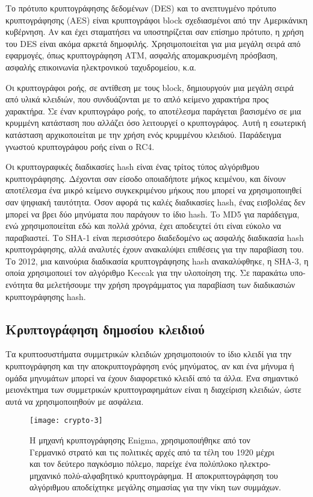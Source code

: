 Το πρότυπο κρυπτογράφησης δεδομένων (DES) και το ανεπτυγμένο πρότυπο κρυπτογράφησης (AES) είναι κρυπτογράφοι block σχεδιασμένοι από την Αμερικάνικη κυβέρνηση. Αν και έχει σταματήσει να υποστηρίζεται σαν επίσημο πρότυπο, η χρήση του DES είναι ακόμα αρκετά δημοφιλής. Χρησιμοποιείται για μια μεγάλη σειρά από εφαρμογές, όπως κρυπτογράφηση ATM, ασφαλής απομακρυσμένη πρόσβαση, ασφαλής επικοινωνία ηλεκτρονικού ταχυδρομείου, κ.α.

Οι κρυπτογράφοι ροής, σε αντίθεση με τους block, δημιουργούν μια μεγάλη σειρά από υλικά κλειδιών, που συνδυάζονται με το απλό κείμενο χαρακτήρα προς χαρακτήρα. Σε έναν κρυπτογράφο ροής, το αποτέλεσμα παράγεται βασισμένο σε μια κρυμμένη κατάσταση που αλλάζει όσο λειτουργεί ο κρυπτογράφος. Αυτή η εσωτερική κατάσταση αρχικοποιείται με την χρήση ενός κρυμμένου κλειδιού. Παράδειγμα γνωστού κρυπτογράφου ροής είναι ο RC4.\cite{cryptography-3}

Οι κρυπτογραφικές διαδικασίες hash είναι ένας τρίτος τύπος αλγόριθμου κρυπτογράφησης. Δέχονται σαν είσοδο οποιαδήποτε μήκος κειμένου, και δίνουν αποτέλεσμα ένα μικρό κείμενο συγκεκριμένου μήκους που μπορεί να χρησιμοποιηθεί σαν ψηφιακή ταυτότητα. Όσον αφορά τις καλές διαδικασίες hash, ένας εισβολέας δεν μπορεί να βρει δύο μηνύματα που παράγουν το ίδιο hash. \cite{cryptography-4}To MD5 για παράδειγμα, ενώ χρησιμοποιείται εδώ και πολλά χρόνια, έχει αποδειχτεί ότι είναι εύκολο να παραβιαστεί. Το SHA-1 είναι περισσότερο διαδεδομένο ως ασφαλής διαδικασία hash κρυπτογράφησης, αλλά αναλυτές έχουν ανακαλύψει επιθέσεις για την παραβίαση του. Το 2012, μια καινούρια διαδικασία κρυπτογράφησης hash ανακαλύφθηκε, η SHA-3, η οποία χρησιμοποιεί τον αλγόριθμο Keccak για την υλοποίηση της. Σε παρακάτω υπο-ενότητα θα μελετήσουμε την χρήση προγράμματος για παραβίαση των διαδικασιών κρυπτογράφησης hash.\cite{cryptography-5}
\subsection{Κρυπτογράφηση δημοσίου κλειδιού}
Τα κρυπτοσυστήματα συμμετρικών κλειδιών χρησιμοποιούν το ίδιο κλειδί για την κρυπτογράφηση και την αποκρυπτογράφηση ενός μηνύματος, αν και ένα μήνυμα ή ομάδα μηνυμάτων μπορεί να έχουν διαφορετικό κλειδί από τα άλλα. Ένα σημαντικό μειονέκτημα των συμμετρικών κρυπτογραφημάτων είναι η διαχείριση κλειδιών, ώστε αυτά να χρησιμοποιηθούν με ασφάλεια. 

\begin{figure}[h]
\centering
\texttt{[image: crypto-3]}
\caption{Η μηχανή κρυπτογράφησης Enigma, χρησιμοποιήθηκε από τον Γερμανικό στρατό και τις πολιτικές αρχές από τα τέλη του 1920 μέχρι και τον δεύτερο παγκόσμιο πόλεμο, παρείχε ένα πολύπλοκο ηλεκτρο-μηχανικό πολύ-αλφαβητικό κρυπτογράφημα. H αποκρυπτογράφηση του αλγόριθμου αποδείχτηκε μεγάλης σημασίας για την νίκη των συμμάχων.}
\end{figure}

